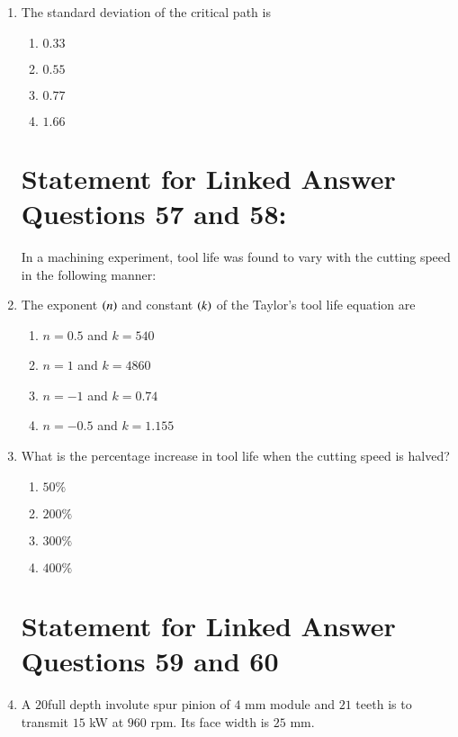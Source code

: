 \documentclass[journal,12pt,twocolumn]{IEEEtran}
\theoremstyle{remark}
\begin{document}
\begin{enumerate}[start=49]
    \item The standard deviation of the critical path is
    \begin{enumerate}
        \item $0.33$
        \item $0.55$
        \item $0.77$
        \item $1.66$
    \end{enumerate}

    

   \section{ Statement for Linked Answer Questions 57 and 58:}
    
    In a machining experiment, tool life was found to vary with the cutting speed in the following manner:
    
    
    \item The exponent $\left(n\right)$ and constant $\left(k\right)$ of the Taylor's tool life equation are
    \begin{enumerate}
        \item $n = 0.5$ and $k = 540$
        \item $n = 1$ and $k = 4860$
        \item $n = -1$ and $k = 0.74$
        \item $n = -0.5$ and $k = 1.155$
    \end{enumerate}
    \item  What is the percentage increase in tool life when the cutting speed is halved?
    \begin{enumerate}
        \item $50\%$
        \item $200\%$
        \item $300\%$
        \item $400\%$
    \end{enumerate}

\section{ Statement for Linked Answer Questions 59 and 60}
    
  \item   A $20$\degree full depth involute spur pinion of $4$ mm module and $21$ teeth is to transmit $15$ kW at $960$ rpm. Its face width is $25$ mm.


\end{enumerate}
\end{document}
